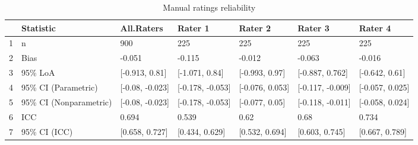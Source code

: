 \begin{table}[ht]
\centering
\begin{tabular}{rllllll}
  \hline
 & Statistic & All.Raters & Rater 1 & Rater 2 & Rater 3 & Rater 4 \\ 
  \hline
1 & n & 900 & 225 & 225 & 225 & 225 \\ 
  2 & Bias & -0.051 & -0.115 & -0.012 & -0.063 & -0.016 \\ 
  3 & 95\% LoA & [-0.913, 0.81] & [-1.071, 0.84] & [-0.993, 0.97] & [-0.887, 0.762] & [-0.642, 0.61] \\ 
  4 & 95\% CI (Parametric) & [-0.08, -0.023] & [-0.178, -0.053] & [-0.076, 0.053] & [-0.117, -0.009] & [-0.057, 0.025] \\ 
  5 & 95\% CI (Nonparametric) & [-0.08, -0.023] & [-0.178, -0.053] & [-0.077, 0.05] & [-0.118, -0.011] & [-0.058, 0.024] \\ 
  6 & ICC & 0.694 & 0.539 & 0.62 & 0.68 & 0.734 \\ 
  7 & 95\% CI (ICC) & [0.658, 0.727] & [0.434, 0.629] & [0.532, 0.694] & [0.603, 0.745] & [0.667, 0.789] \\ 
   \hline
\end{tabular}
\caption{Manual ratings reliability} 
\label{tab:summary}
\end{table}
